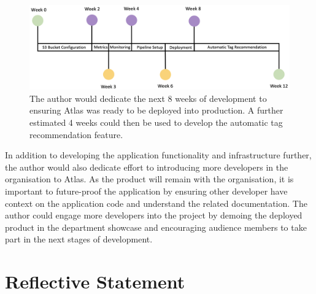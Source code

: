 \documentclass{article}
\begin{document}
\begin{figure}[!htb]
  \centering
      \includegraphics[width=1\textwidth]{images/future-timeline.png}
  \caption{The author would dedicate the next 8 weeks of development to ensuring Atlas was ready to be deployed into production. A further estimated 4 weeks could then be used to develop the automatic tag recommendation feature.}
\end{figure}

In addition to developing the application functionality and infrastructure further, the author would also dedicate effort to introducing more developers in the organisation to Atlas. As the product will remain with the organisation, it is important to future-proof the application by ensuring other developer have context on the application code and understand the related documentation. The author could engage more developers into the project by demoing the deployed product in the department showcase and encouraging audience members to take part in the next stages of development.

\newpage
\section{Reflective Statement}


\newpage
\end{document}

